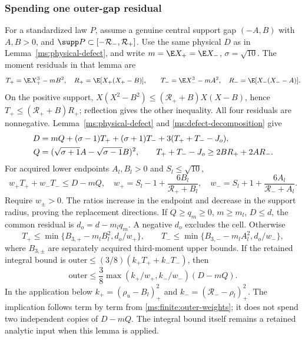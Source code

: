 \subsubsection{Spending one outer-gap residual}
For a standardized law $P$, assume a genuine central support gap
$(-A,B)$ with $A,B>0$, and $\supp P\subset[-\mathcal R_-,\mathcal R_+]$. Use the same physical
$D$ as in Lemma~\ref{ms:physical-defect}, and write
$m=\E X_+=\E X_-$, $\sigma=\sqrt{10}$. The moment residuals in that
lemma are
\[
 T_+=\E X_+^3-mB^2,\quad R_+=\E[X_+(X_+-B)],
 \qquad T_-=\E X_-^3-mA^2,\quad R_-=\E[X_-(X_--A)].
\]
On the positive support,
$X(X^2-B^2)\le(\mathcal R_++B)X(X-B)$, hence
$T_+\le(\mathcal R_++B)R_+$; reflection gives the other inequality.
All four residuals are nonnegative. Lemma~\ref{ms:physical-defect}
and \eqref{ms:defect-decomposition} give
\begin{align}
 D&=mQ+(\sigma-1)T_++(\sigma+1)T_-+3(T_++T_--J_o),\notag\\
 Q&=(\sqrt{\sigma+1}A-\sqrt{\sigma-1}B)^2,
 \qquad T_++T_--J_o\ge2BR_++2AR_-.
 \label{ms:finite:outer-decomposition}
\end{align}
For acquired lower endpoints $A_l,B_l>0$ and $S_l\le\sqrt{10}$,
\begin{equation}
 w_+T_++w_-T_-\le D-mQ,\quad
 w_+=S_l-1+\frac{6B_l}{\mathcal R_++B_l},\quad
 w_-=S_l+1+\frac{6A_l}{\mathcal R_-+A_l}.
 \label{ms:finite:outer-weights}
\end{equation}
Require $w_\pm>0$. The ratios increase in the endpoint and decrease
in the support radius, proving the replacement directions.
If $Q\ge q_m\ge0$, $m\ge m_l$, $D\le d$, the common residual is
$d_o=d-m_lq_m$. A negative $d_o$ excludes the cell. Otherwise
\[
 T_+\le\min\{B_{3,+}-m_lB_l^2,d_o/w_+\},\qquad
 T_-\le\min\{B_{3,-}-m_lA_l^2,d_o/w_-\},
\]
where $B_{3,\pm}$ are separately acquired third-moment upper bounds.
If the retained integral bound is
$\mathrm{outer}\le(3/8)(k_+T_++k_-T_-)$, then
\[
 \mathrm{outer}\le\frac38\max(k_+/w_+,k_-/w_-)(D-mQ).
\]
In the application below $k_+=(\rho_u-B_l)_+^2$ and
$k_-=(\mathcal R_--\rho_l)_+^2$. The implication follows term by
term from \eqref{ms:finite:outer-weights}; it does not spend two
independent copies of $D-mQ$. The integral bound itself remains a
retained analytic input when this lemma is applied.

